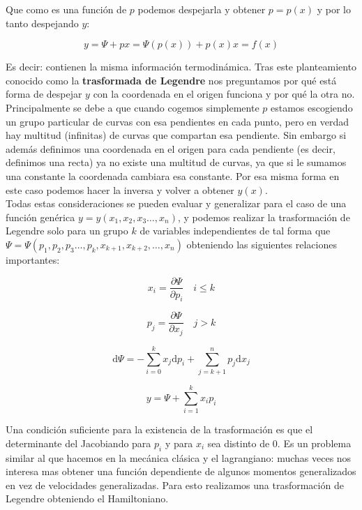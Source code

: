 \documentclass[12pt,a4paper]{article}
\newcommand{\D}{\mathrm{d}}
\newcommand{\parciales}[2]{\frac{\partial #1}{\partial #2}}
\begin{document}
Que como es una función de $p$ podemos despejarla y obtener $p = p(x)$ y por lo tanto despejando $y$:

$$ y = \Psi + px = \Psi(p(x)) + p(x) x = f(x) $$ 

Es decir: contienen la misma información termodinámica. Tras este planteamiento conocido como la \textbf{trasformada de Legendre} nos preguntamos por qué está forma de despejar $y$ con la coordenada en el origen funciona y por qué la otra no. Principalmente se debe a que cuando cogemos simplemente $p$ estamos escogiendo un grupo particular de curvas con esa pendientes en cada punto, pero en verdad hay multitud (infinitas) de curvas que compartan esa pendiente. Sin embargo si además definimos una coordenada en el origen para cada pendiente (es decir, definimos una recta) ya no existe una multitud de curvas, ya que si le sumamos una constante la coordenada cambiara esa constante. Por esa misma forma en este caso podemos hacer la inversa y volver a obtener $y(x)$.  \\

Todas estas consideraciones se pueden evaluar y generalizar para el caso de una función genérica  $y = y(x_1,x_2,x_3 \ldots, x_n)$, y podemos realizar la trasformación de Legendre solo para un grupo $k$ de variables independientes de tal forma que $\Psi = \Psi(p_1,p_2,p_3 \ldots,p_k, x_{k+1}, x_{k+2}, \ldots, x_n)$ obteniendo las siguientes relaciones importantes:

\begin{equation}
x_i = \parciales{\Psi}{p_i} \quad i \leq k 
\end{equation}

\begin{equation}
p_j = \parciales{\Psi}{x_j} \quad j > k
\end{equation}

\begin{equation}
\D \Psi = - \sum_{i=0}^k x_j \D p_i + \sum_{j=k+1}^n p_j \D x_j
\end{equation}

\begin{equation}
 y  = \Psi + \sum_{i=1}^k x_i p_i
\end{equation}

Una condición suficiente para la existencia de la trasformación es que el determinante del Jacobiando para $p_i$ y para $x_i$ sea distinto de 0. Es un problema similar al que hacemos en la mecánica clásica y el lagrangiano: muchas veces nos interesa mas obtener una función dependiente de algunos momentos generalizados en vez de velocidades generalizadas. Para esto realizamos una trasformación de Legendre obteniendo el Hamiltoniano. 
\end{document}
